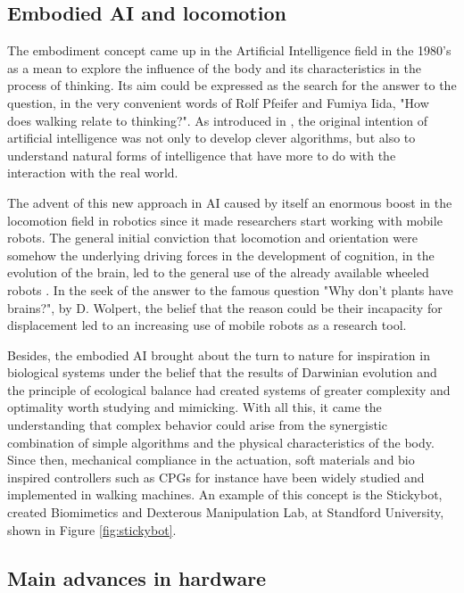 \subsection{Embodied AI and locomotion} %
\label{sub:the_embodiment_}
The embodiment concept came up in the Artificial Intelligence field in the 1980's as a mean to explore the influence of the body and its characteristics in the process of thinking. 
Its aim could be expressed as the search for the answer to the question, in the very convenient words of Rolf Pfeifer and Fumiya Iida, "How does walking relate to thinking?".
As introduced in \cite{pfeifer}, the original intention of artificial intelligence was not only to develop clever algorithms, but also to understand natural forms of intelligence that have more to do with the interaction with the real world.

The advent of this new approach in AI caused by itself an enormous boost in the locomotion field in robotics since it made researchers start working with mobile robots.
The general initial conviction that locomotion and orientation were somehow the underlying driving forces in the development of cognition, in the evolution of the brain, led to the general use of the already available wheeled robots \cite{pfeifer}.
In the seek of the answer to the famous question "Why don’t plants have brains?", by D. Wolpert, the belief that the reason could be their incapacity for displacement led to an increasing use of mobile robots as a research tool.

Besides, the embodied AI brought about the turn to nature for inspiration in biological systems under the belief that the results of Darwinian evolution and the principle of ecological balance had created systems of greater complexity and optimality worth studying and mimicking.
With all this, it came the understanding that complex behavior could arise from the synergistic combination of simple algorithms and the physical characteristics of the body.
Since then, mechanical compliance in the actuation, soft materials and bio inspired controllers such as CPGs for instance have been widely studied and implemented in walking machines. 
An example of this concept is the Stickybot, created Biomimetics and Dexterous Manipulation Lab, at Standford University, shown in Figure \ref{fig:stickybot}.

\subsection{Main advances in hardware} %
\label{sub:the_advances_in_hardware}



